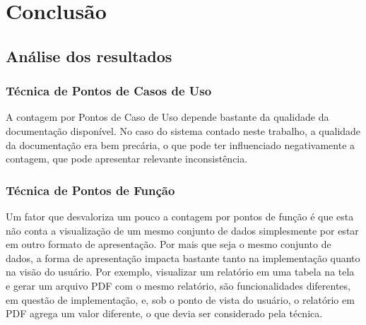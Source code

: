 \chapter{Conclusão}

  \section{Análise dos resultados}
    
      \subsection{Técnica de Pontos de Casos de Uso}
      
	A contagem por Pontos de Caso de Uso depende bastante da qualidade da documentação disponível.
	No caso do sistema contado neste trabalho, a qualidade da documentação era bem precária, o que pode 
	ter influenciado negativamente a contagem, que pode apresentar relevante inconsistência.
	
      \subsection{Técnica de Pontos de Função}
	
	Um fator que desvaloriza um pouco a contagem por pontos de função é que esta não conta a visualização de um mesmo 
	conjunto de dados simplesmente por estar em outro formato de apresentação. Por mais que seja o mesmo conjunto de dados, 
	a forma de apresentação impacta bastante tanto na implementação quanto na visão do usuário. Por exemplo, visualizar um relatório 
	em uma tabela na tela e gerar um arquivo PDF com o mesmo relatório, são funcionalidades diferentes, em questão de implementação, 
	e, sob o ponto de vista do usuário, o relatório em PDF agrega um valor diferente, o que devia ser considerado pela técnica.